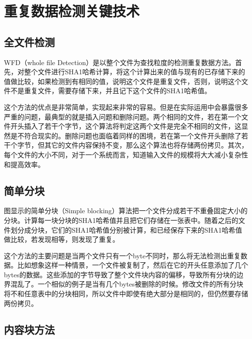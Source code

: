
\chapter{重复数据检测关键技术}
\label{chap:tech}

\section{全文件检测}
\label{sec:WFD}

WFD（whole file Detection）是以整个文件为查找粒度的检测重复数据方法。首先，对整个文件进行SHA1哈希计算，将这个计算出来的值与现有的已存储下来的值做比较，如果检测到有相同的值，说明这个文件是重复文件，否则，说明这个文件不是重复文件，需要存储下来，并且记下这个文件的SHA1哈希值。

这个方法的优点是非常简单，实现起来非常的容易。但是在实际运用中会暴露很多严重的问题，最典型的就是插入问题和删除问题。两个相同的文件，若在第一个文件开头插入了若干个字节，这个算法将判定这两个文件是完全不相同的文件，这显然是不符合现实的。删除问题也面临着同样的困境，若在第一个文件开头删除了若干个字节，但其它的文件内容保持不变，那么这个算法也将存储两份拷贝。其次，每个文件的大小不同，对于一个系统而言，知道输入文件的规模将大大减小复杂性和提高效率。

\section{简单分块}
\label{sec:simpleblock}

图显示的简单分块（Simple blocking）算法把一个文件分成若干不重叠固定大小的分块。计算每一块分块的SHA1哈希值并且把它们存储在一张表中。随着之后的文件划分成分块，它们的SHA1哈希值分别被计算，和已经保存下来的SHA1哈希值做比较，若发现相等，则发现了重复。

这个方法的主要问题是当两个文件只有一个byte不同时，那么将无法检测出重复数据。比如想象这样一种情景，一个文件被复制了，然后在它的开头任意添加了几个bytes的数据。这些添加的字节导致了整个文件块内容的偏移，导致所有分块的边界混乱了。一个相似的例子是当有几个bytes被删除的时候。修改文件的所有分块将不和任意表中的分块相同，所以文件中即使有绝大部分是相同的，但仍然要存储两份拷贝。

\section{内容块方法}
\label{sec:contentchunk}

